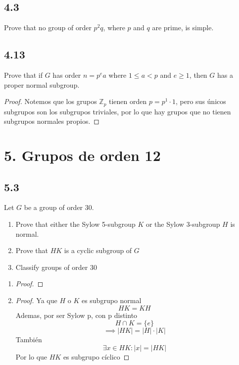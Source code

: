 \documentclass[11pt]{article}
\newcommand{\set}[1]{\mathbb{#1}}
\theoremstyle{definition}
\begin{document}
        \subsection{4.3}
        Prove that no group of order $p^2q$, where $p$ and $q$ are prime, is simple.
        \subsection{4.13}
        Prove that if $G$ has order $n=p^ea$ where $1\leq a<p$ and $e\geq 1$, then $G$ has a proper normal subgroup.
        \begin{proof}
            Notemos que los grupos $\set{Z}_p$ tienen orden $p=p^1\cdot 1$, pero sus únicos subgrupos son los subgrupos triviales, por lo que hay grupos que no tienen subgrupos normales propios.
        \end{proof}

        \section{5. Grupos de orden 12}
        \subsection{5.3}
        Let $G$ be a group of order 30.
        \begin{enumerate}[label=\textbf{(\alph*)}]
            \item Prove that either the Sylow 5-subgroup $K$ or the Sylow 3-subgroup $H$ is normal.

            \item Prove that $HK$ is a cyclic subgroup of $G$

            \item Classify groups of order 30
        \end{enumerate}

        \begin{enumerate}[label=\textbf{(\alph*)}]
            \item \begin{proof}
                
            \end{proof}

            \item \begin{proof}
                Ya que $H$ o $K$ es subgrupo normal
                \[HK=KH\]
                Ademas, por ser Sylow p, con p distinto
                \[H\cap K=\{e\}\]
                \[\implies |HK|=|H|\cdot|K|\]
                También
                \[\exists x\in HK:|x|=|HK|\]
                Por lo que $HK$ es subgrupo cíclico
            \end{proof}
        \end{enumerate}
\end{document}
